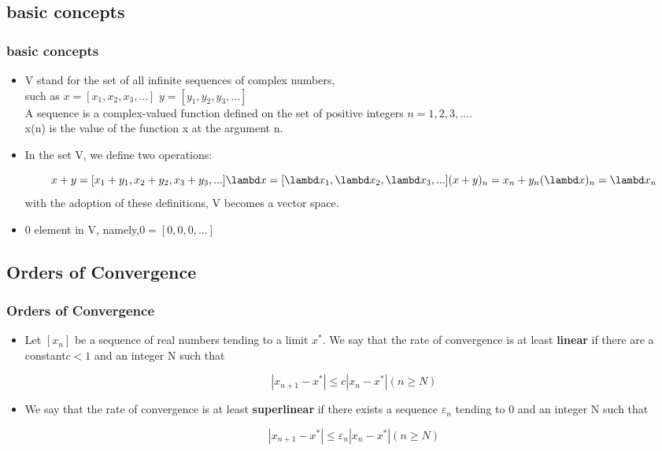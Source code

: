 \documentclass[notheorems,mathserif,table,compress]{beamer}  %
\begin{document}
\subsection{basic  concepts} %
\begin{frame}
  \frametitle{basic  concepts }
  \begin{itemize}
  \item V stand for  the set of all infinite  sequences of complex numbers,\\
        such  as  $x=[x_1, x_2, x_3, ...]$   $y=[y_1, y_2, y_3, ...]$  \\
        A sequence is a complex-valued  function  defined  on  the  set of positive  integers $n={1,2,3,...}$.\\
        x(n) is the value of the function x at  the  argument n. 
  \item In the  set V, we define two operations:
   

  \begin{displaymath} 
  x+y=[x_1+y_1, x_2+y_2, x_3+y_3,...]
  \lambd x =[\lambd x_1, \lambd x_2, \lambd x_3,...]
  (x+y)_n=x_n+y_n
  (\lambd x)_n=\lambd x_n
 \end{displaymath}
  with  the adoption of these definitions, V becomes a vector space. 

  \item 0 element in V, namely,$0=[0,0,0,...]$
  \end{itemize}
\end{frame}

\subsection{Orders of Convergence} 

\begin{frame}
  \frametitle{Orders of Convergence}
  \begin{itemize}
  \item Let $[ x_n ]$ be a sequence of real numbers tending to a limit $x^*$. We say
that the rate of convergence is at least \textbf{linear} if there are a constant$ c < 1$ and an
integer N such that 
  
 \begin{displaymath}
 |x_{n+1}-x^*|\leq  c|x_n-x^*|   (n\geq  N)
 \end{displaymath}

  \item   We say that the rate of convergence is at least \textbf{superlinear} if there exists a sequence
$\varepsilon_{n}$ tending to 0 and an integer N such that 
 
  \begin{displaymath}
 |x_{n+1}-x^*|\leq  \varepsilon_n|x_n-x^*|  (n\geq  N)
 \end{displaymath}

  \end{itemize}
\end{frame}
\end{document}
